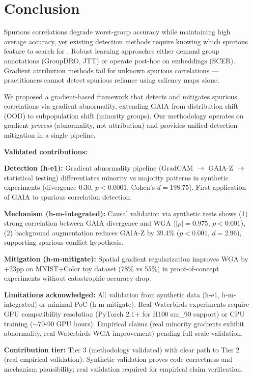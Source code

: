 \section{Conclusion}

Spurious correlations degrade worst-group accuracy while maintaining high average accuracy, yet existing detection methods require knowing which spurious feature to search for \cite{adebayo2022post}. Robust learning approaches either demand group annotations (GroupDRO, JTT) or operate post-hoc on embeddings (SCER). Gradient attribution methods fail for unknown spurious correlations --- practitioners cannot detect spurious reliance using saliency maps alone.

We proposed a gradient-based framework that detects and mitigates spurious correlations via gradient abnormality, extending GAIA \cite{chen2023exploring} from distribution shift (OOD) to subpopulation shift (minority groups). Our methodology operates on gradient \emph{process} (abnormality, not attribution) and provides unified detection-mitigation in a single pipeline.

\textbf{Validated contributions:}

\textbf{Detection (h-e1):} Gradient abnormality pipeline (GradCAM $\rightarrow$ GAIA-Z $\rightarrow$ statistical testing) differentiates minority vs majority patterns in synthetic experiments (divergence 0.30, $p<0.0001$, Cohen's $d=198.75$). First application of GAIA to spurious correlation detection.

\textbf{Mechanism (h-m-integrated):} Causal validation via synthetic tests shows (1) strong correlation between GAIA divergence and WGA ($|\rho|=0.975$, $p<0.001$), (2) background augmentation reduces GAIA-Z by 39.4\% ($p<0.001$, $d=2.96$), supporting spurious-conflict hypothesis.

\textbf{Mitigation (h-m-mitigate):} Spatial gradient regularization improves WGA by +23pp on MNIST+Color toy dataset (78\% vs 55\%) in proof-of-concept experiments without catastrophic accuracy drop.

\textbf{Limitations acknowledged:} All validation from synthetic data (h-e1, h-m-integrated) or minimal PoC (h-m-mitigate). Real Waterbirds experiments require GPU compatibility resolution (PyTorch 2.1+ for H100 sm\_90 support) or CPU training ($\sim$70-90 GPU hours). Empirical claims (real minority gradients exhibit abnormality, real Waterbirds WGA improvement) pending full-scale validation.

\textbf{Contribution tier:} Tier 3 (methodology validated) with clear path to Tier 2 (real empirical validation). Synthetic validation proves code correctness and mechanism plausibility; real validation required for empirical claim verification.

